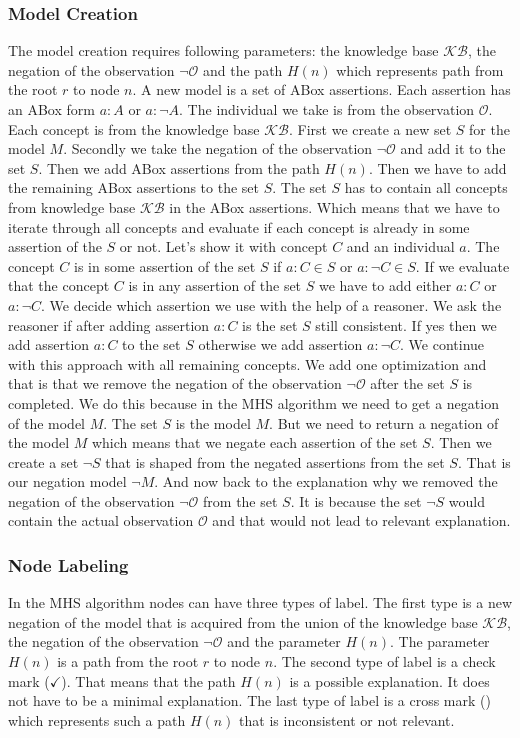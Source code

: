 \documentclass[12pt,a4paper]{article}
\newcommand{\xmark}{\ding{53}}
\begin{document}
\subsubsection{Model Creation}
\label{subsubsection:modelCreation}
The model creation requires following parameters: the knowledge base $\mathcal{KB}$, the negation of the observation $\neg \mathcal{O}$ and the path $H(n)$ which represents path from the root $r$ to node $n$. A new model is a set of ABox assertions. Each assertion has an ABox form $a:A$ or $a:\neg A$. The individual we take is from the observation $\mathcal{O}$. Each concept is from the knowledge base $\mathcal{KB}$. First we create a new set $S$ for the model $M$. Secondly we take the negation of the observation $\neg \mathcal{O}$ and add it to the set $S$. Then we add ABox assertions from the path $H(n)$. Then we have to add the remaining ABox assertions to the set $S$. The set $S$ has to contain all concepts from knowledge base $\mathcal{KB}$ in the ABox assertions. Which means that we have to iterate through all concepts and evaluate if each concept is already in some assertion of the $S$ or not. Let's show it with concept $C$ and an individual $a$. The concept $C$ is in some assertion of the set $S$ if $a:C \in S$ or $a:\neg C \in S$. If we evaluate that the concept $C$ is in any assertion of the set $S$ we have to add either $a:C$ or $a:\neg C$. We decide which assertion we use with the help of a reasoner. We ask the reasoner if after adding assertion $a:C$ is the set $S$ still consistent. If yes then we add assertion $a:C$ to the set $S$ otherwise we add assertion $a:\neg C$. We continue with this approach with all remaining concepts. We add one optimization and that is that we remove the negation of the observation $\neg \mathcal{O}$ after the set $S$ is completed. We do this because in the MHS algorithm we need to get a negation of the model $M$. The set $S$ is the model $M$. But we need to return a negation of the model $M$ which means that we negate each assertion of the set $S$. Then we create a set $\neg S$ that is shaped from the negated assertions from the set $S$. That is our negation model $\neg M$. And now back to the explanation why we removed the negation of the observation $\neg \mathcal{O}$ from the set $S$. It is because the set $\neg S$ would contain the actual observation $\mathcal{O}$ and that would not lead to relevant explanation.

\subsubsection{Node Labeling}
\label{subsubsection:nodeLabeling}
In the MHS algorithm nodes can have three types of label. The first type is a new negation of the model that is acquired from the union of the knowledge base $\mathcal{KB}$, the negation of the observation $\neg \mathcal{O}$ and the parameter $H(n)$. The parameter $H(n)$ is a path from the root $r$ to node $n$. The second type of label is a check mark ($\checkmark$). That means that the path $H(n)$ is a possible explanation. It does not have to be a minimal explanation. The last type of label is a cross mark (\xmark) which represents such a path $H(n)$ that is inconsistent or not relevant.
\end{document}
